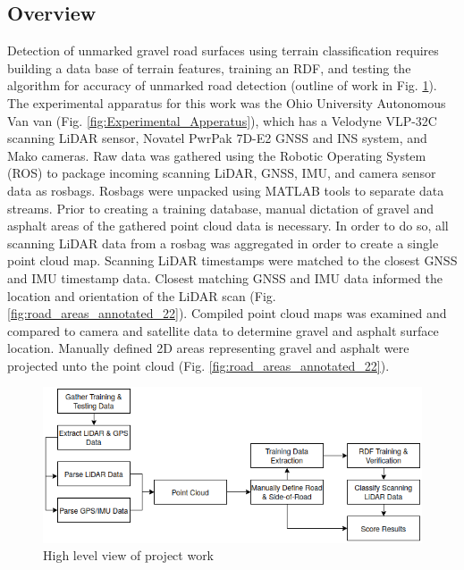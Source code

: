 \documentclass[numbered,pdftex]{ohio-etd}
\begin{document}
{
	
	\subsection{Overview}
	
		{Detection of unmarked gravel road surfaces using terrain classification requires building a data base of terrain features, training an RDF, and testing the algorithm for accuracy of unmarked road detection (outline of work in Fig. \ref{fig:flowz_2}). The experimental apparatus for this work was the Ohio University Autonomous Van van (Fig. \ref{fig:Experimental_Apperatus}), which has a Velodyne VLP-32C scanning LiDAR sensor, Novatel PwrPak 7D-E2 GNSS and INS system, and Mako cameras. Raw data was gathered using the Robotic Operating System (ROS) to package incoming scanning LiDAR, GNSS, IMU, and camera sensor data as rosbags. Rosbags were unpacked using MATLAB tools to separate data streams. Prior to creating a training database, manual dictation of gravel and asphalt areas of the gathered point cloud data is necessary. In order to do so, all scanning LiDAR data from a rosbag was aggregated in order to create a single point cloud map. Scanning LiDAR timestamps were matched to the closest GNSS and IMU timestamp data. Closest matching GNSS and IMU data informed the location and orientation of the LiDAR scan (Fig. \ref{fig:road_areas_annotated_22}). Compiled point cloud maps was examined and compared to camera and satellite data to determine gravel and asphalt surface location. Manually defined 2D areas representing gravel and asphalt were projected unto the point cloud (Fig. \ref{fig:road_areas_annotated_22}).}
		
		\begin{figure}[H]
			\centering
			\includegraphics[width=0.7\linewidth]{Defense_Images/flowz_2}
			\caption[Project Flow]{High level view of project work}
			\label{fig:flowz_2}
		\end{figure}
		
}
\end{document}

